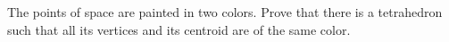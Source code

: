 The points of space are painted in two colors. Prove that there is a tetrahedron such that all its vertices and its centroid are of the same color.